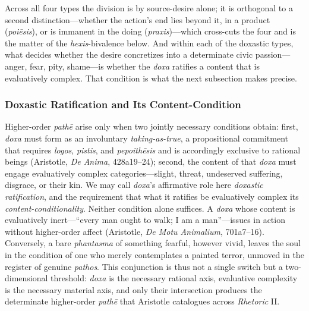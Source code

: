Across all four types the division is by source-desire alone; it is orthogonal to a second distinction---whether the action's end lies beyond it, in a product (\textit{poiēsis}), or is immanent in the doing (\textit{praxis})---which cross-cuts the four and is the matter of the \textit{hexis}-bivalence below. And within each of the doxastic types, what decides whether the desire concretizes into a determinate civic passion---anger, fear, pity, shame---is whether the \textit{doxa} ratifies a content that is evaluatively complex. That condition is what the next subsection makes precise.


\subsubsection*{Doxastic Ratification and Its Content-Condition}

Higher-order \textit{pathē} arise only when two jointly necessary conditions obtain: first, \textit{doxa} must form as an involuntary \textit{taking-as-true}, a propositional commitment that requires \textit{logos}, \textit{pistis}, and \textit{pepoithēsis} and is accordingly exclusive to rational beings (Aristotle, \textit{De Anima}, 428a19--24); second, the content of that \textit{doxa} must engage evaluatively complex categories---slight, threat, undeserved suffering, disgrace, or their kin. We may call \textit{doxa}'s affirmative role here \textit{doxastic ratification}, and the requirement that what it ratifies be evaluatively complex its \textit{content-conditionality}. Neither condition alone suffices. A \textit{doxa} whose content is evaluatively inert---``every man ought to walk; I am a man''---issues in action without higher-order affect (Aristotle, \textit{De Motu Animalium}, 701a7--16). Conversely, a bare \textit{phantasma} of something fearful, however vivid, leaves the soul in the condition of one who merely contemplates a painted terror, unmoved in the register of genuine \textit{pathos}. This conjunction is thus not a single switch but a two-dimensional threshold: \textit{doxa} is the necessary rational axis, evaluative complexity is the necessary material axis, and only their intersection produces the determinate higher-order \textit{pathē} that Aristotle catalogues across \textit{Rhetoric} II.

